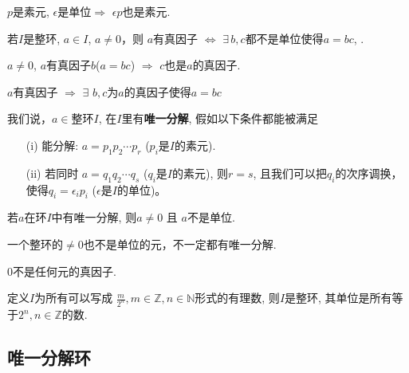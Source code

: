 \begin{Theorem}
$p$是素元, $\epsilon$是单位$\Rightarrow$ $\epsilon p$也是素元.
\end{Theorem}

\begin{Theorem}[!!]
若$I$是整环, $a \in I$, $a \neq \mathfrak{0}$，则 $a$有真因子 $\Leftrightarrow$ 
$\exists\, b,c$都不是单位使得$a = bc$, .
\end{Theorem}

\begin{Corollary}
$a\neq 0$, $a$有真因子$b$\;($a = bc$) $\Rightarrow$ $c$也是$a$的真因子.
\end{Corollary}

\begin{Note}
$a$有真因子 $\Rightarrow$ $\exists$ $b, c$为$a$的真因子使得$a = bc$
\end{Note}

\begin{Definition}[唯一分解]
我们说，$a \in $整环$I$, 在$I$里有\textbf{唯一分解}, 假如以下条件都能被满足
\begin{enumerate}[(1)]
	\item[(i)] 能分解: $a = p_1 p_2 \cdots p_r$ ($p_i$是$I$的素元).
	\item[(ii)] 若同时 $a = q_1 q_2 \cdots q_s$ ($q_i$是$I$的素元), 则$r=s$, 且我们可以把$q_i$的次序调换，使得$q_i = \epsilon_i p_i$ ($\epsilon$是$I$的单位)。
\end{enumerate}
\end{Definition}

\begin{Note}
若$a$在环$I$中有唯一分解, 则$a \neq \mathfrak{0}$ 且 $a$不是单位.
\end{Note}

\begin{Note}
一个整环的$\neq \mathfrak{0}$也不是单位的元，不一定都有唯一分解.
\end{Note}

\begin{Proposition}
$\mathfrak{0}$不是任何元的真因子.
\end{Proposition}

\begin{Proposition}
定义$I$为所有可以写成 $\displaystyle \frac{m}{2^n}, m \in \mathbb{Z}, n \in \mathbb{N}$形式的有理数, 则$I$是整环, 其单位是所有等于$2^n, n \in \mathbb{Z}$的数.
\end{Proposition}

\subsection{唯一分解环} %

